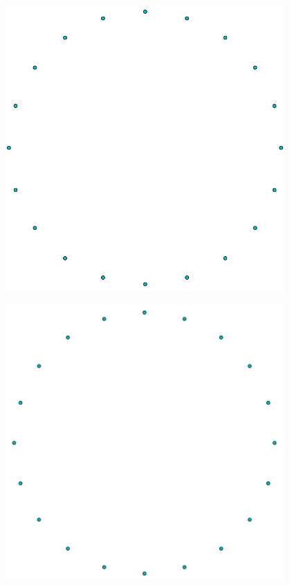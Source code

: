 \documentclass{beamer}
\begin{document}
\begin{frame}
    \begin{center}
        \includegraphics[width=0.8\textwidth]{static/death_star.png}
    \end{center}
\end{frame}

\begin{frame}
    \begin{center}
        \includegraphics[width=0.8\textwidth]{static/complex.png}
    \end{center}
\end{frame}
\end{document}
